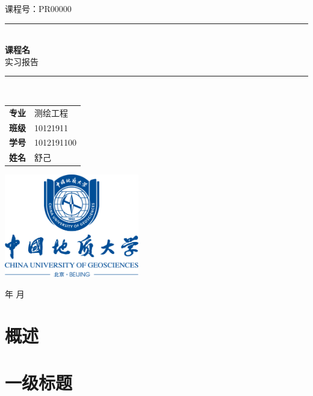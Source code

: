 \documentclass[12pt,a4paper]{article}
\begin{document}
\renewcommand{\today}{\number\year 年 \number\month 月}
\begin{titlepage}
    \clearpage\thispagestyle{empty}
    \centering
    \vspace{1cm}

    {\fangsong 课程号：PR00000}
    \vspace{2.5cm}

    \rule{\linewidth}{2mm} \\[0.5cm]
    { \Huge \kaishu \textbf{课程名}\\[0.2em]
    实习报告}\\[0.5cm]
    \rule{\linewidth}{0.6mm} \\[3.4cm]

    \hspace{2cm}
    \begin{tabular}{l p{5cm}}
        \textbf{专业} & 测绘工程   \\[18pt]
        \textbf{班级} & 10121911   \\[18pt]
        \textbf{学号} & 1012191100 \\[18pt]
        \textbf{姓名} & 舒己
    \end{tabular}

    \vspace{1.5cm}
    \centering \includegraphics[height=4.5cm]{校徽与中英文（蓝色中轴式）.png}\\ %
    \vspace{1.5cm}
    \begin{center}
        \today
    \end{center}
\end{titlepage}
\tableofcontents\thispagestyle{empty}
\newpage
\setcounter{page}{1}
\section{概述}

\section{一级标题}
\end{document}

